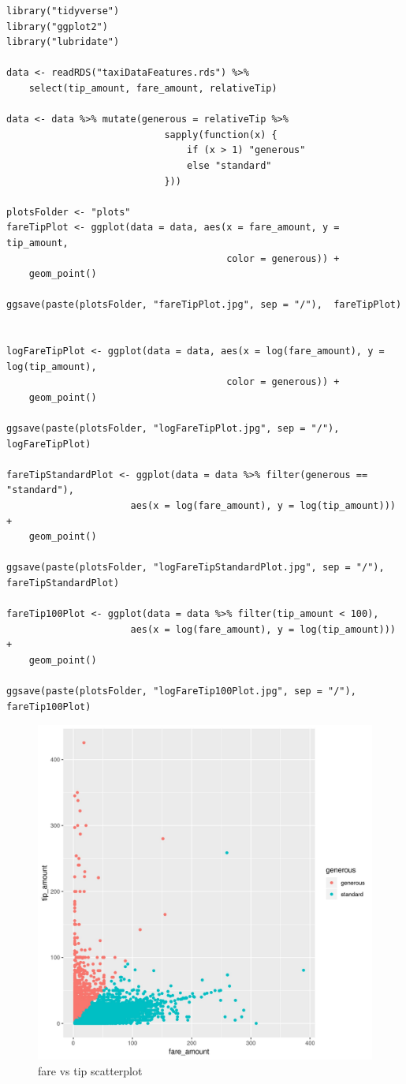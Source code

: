 \documentclass[11pt]{article}
\begin{document}
\begin{verbatim}
library("tidyverse")
library("ggplot2")
library("lubridate")

data <- readRDS("taxiDataFeatures.rds") %>%
    select(tip_amount, fare_amount, relativeTip)

data <- data %>% mutate(generous = relativeTip %>%
                            sapply(function(x) {
                                if (x > 1) "generous"
                                else "standard"
                            }))

plotsFolder <- "plots"
fareTipPlot <- ggplot(data = data, aes(x = fare_amount, y = tip_amount,
                                       color = generous)) +
    geom_point()

ggsave(paste(plotsFolder, "fareTipPlot.jpg", sep = "/"),  fareTipPlot)


logFareTipPlot <- ggplot(data = data, aes(x = log(fare_amount), y = log(tip_amount),
                                       color = generous)) +
    geom_point()

ggsave(paste(plotsFolder, "logFareTipPlot.jpg", sep = "/"),  logFareTipPlot)

fareTipStandardPlot <- ggplot(data = data %>% filter(generous == "standard"),
                      aes(x = log(fare_amount), y = log(tip_amount))) +
    geom_point()

ggsave(paste(plotsFolder, "logFareTipStandardPlot.jpg", sep = "/"),  fareTipStandardPlot)

fareTip100Plot <- ggplot(data = data %>% filter(tip_amount < 100),
                      aes(x = log(fare_amount), y = log(tip_amount))) +
    geom_point()

ggsave(paste(plotsFolder, "logFareTip100Plot.jpg", sep = "/"),  fareTip100Plot)
\end{verbatim}
\begin{figure}[htbp]
\centering
\includegraphics[width=.9\linewidth]{./plots/fareTipPlot.jpg}
\caption{\label{fig:orgcb1bff9}
fare vs tip scatterplot}
\end{figure}
\end{document}
